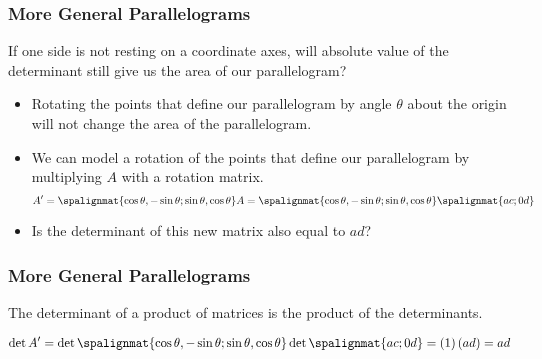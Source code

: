 \begin{frame}\frametitle{More General Parallelograms}

    If one side is not resting on a coordinate axes, will absolute value of the determinant still give us the area of our parallelogram? 
        
    \begin{itemize}
        \item<2-> Rotating the points that define our parallelogram by angle $\theta$ about the origin will not change the area of the parallelogram. 
        \item<3-> We can model a rotation of the points that define our parallelogram by multiplying $A$ with a rotation matrix. 
        $$A' = \spalignmat{\cos\theta, -\sin\theta;\sin\theta , \cos\theta} A = \spalignmat{\cos\theta ,-\sin\theta;\sin\theta , \cos\theta} \spalignmat{a c;0 d}$$
        \item<4-> Is the determinant of this new matrix also equal to $ad$? 
    \end{itemize}
    
\end{frame}



\begin{frame}\frametitle{More General Parallelograms}

    The determinant of a product of matrices is the product of the determinants.
    
    \pause 
    
    $$\det A' = \det \spalignmat{\cos\theta, -\sin\theta;\sin\theta ,  \cos\theta} \det \spalignmat{a c;0 d} = (1) \, (ad) = ad $$
    
    \pause 
    \vspace{12pt}
    
    \begin{center}\end{center}
 



\end{frame}


